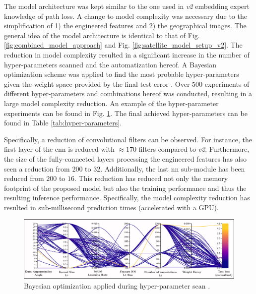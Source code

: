 The model architecture was kept similar to the one used in \emph{v2} embedding expert knowledge of path loss. A change to model complexity was necessary due to the simplification of 1) the engineered features and 2) the geographical images. The general idea of the model architecture is identical to that of Fig. \ref{fig:combined_model_approach} and Fig. \ref{fig:satellite_model_setup_v2}. The reduction in model complexity resulted in a significant increase in the number of hyper-parameters scanned and the automatization hereof. A Bayesian optimization scheme was applied to find the most probable hyper-parameters given the weight space provided by the final test error \cite{YuHyper-ParameterApplications, wandb}. Over $500$ experiments of different hyper-parameters and combinations hereof was conducted, resulting in a large model complexity reduction. An example of the hyper-parameter experiments can be found in Fig. \ref{fig:hyper-paramters_scan}. The final achieved hyper-parameters can be found in Table \ref{tab:hyper-parameters}.

Specifically, a reduction of convolutional filters can be observed. For instance, the first layer of the \gls{cnn} is reduced with $\approx 170$ filters compared to \emph{v2}. Furthermore, the size of the fully-connected layers processing the engineered features has also seen a reduction from $200$ to $32$. Additionally, the last \gls{nn} sub-module has been reduced from $200$ to $16$. This reduction has reduced not only the memory footprint of the proposed model but also the training performance and thus the resulting inference performance. Specifically, the model complexity reduction has resulted in sub-millisecond prediction times (accelerated with a GPU). 

\begin{figure}
    \centering
    \includegraphics{chapters/part_pathloss/osm_images_paper/figures/hyperparameter_scan.eps}
    \caption{Bayesian optimization applied during hyper-parameter scan \cite{wandb}.}
    \label{fig:hyper-paramters_scan}
\end{figure}


